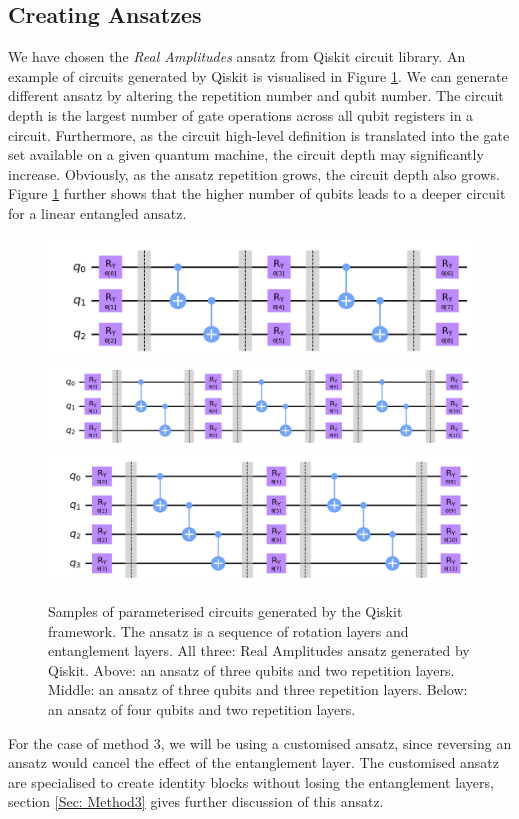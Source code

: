 \subsection{Creating Ansatzes} \label{Sec: Creating Ansatzes}
We have chosen the \textit{Real Amplitudes} ansatz from Qiskit circuit library.
An example of circuits generated by Qiskit is visualised in Figure \ref{Fig: Ansatz samples}.
We can generate different ansatz by altering the repetition number and qubit number.
The circuit depth is the largest number of gate operations across all qubit registers in a circuit.
Furthermore, as the circuit high-level definition is translated into the gate set available on a given quantum machine, the circuit depth may significantly increase.
Obviously, as the ansatz repetition grows, the circuit depth also grows.
Figure \ref{Fig: Ansatz samples} further shows that the higher number of qubits leads to a deeper circuit for a linear entangled ansatz.

\begin{figure}
    \includegraphics[width=\linewidth]{Artefact/Appendices/ansatz3-2.png}
    \includegraphics[width=\linewidth]{Artefact/Appendices/ansatz3-3.png}
    \includegraphics[width=\linewidth]{Artefact/Appendices/ansatz4-2.png}
    \caption{
        Samples of parameterised circuits generated by the Qiskit framework.
        The ansatz is a sequence of rotation layers and entanglement layers.
        All three: Real Amplitudes ansatz generated by Qiskit.
        Above: an ansatz of three qubits and two repetition layers.
        Middle: an ansatz of three qubits and three repetition layers.
        Below: an ansatz of four qubits and two repetition layers.
    }
    \label{Fig: Ansatz samples}
\end{figure}

For the case of method 3, we will be using a customised ansatz, since reversing an ansatz would cancel the effect of the entanglement layer.
The customised ansatz are specialised to create identity blocks without losing the entanglement layers, section \ref{Sec: Method3} gives further discussion of this ansatz.